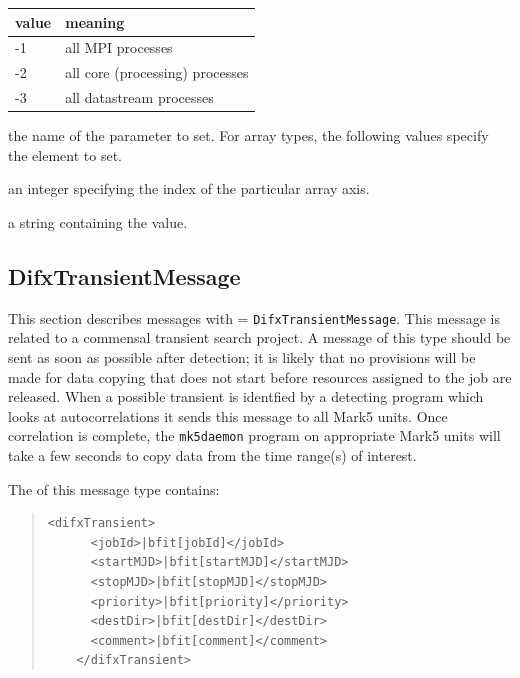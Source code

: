 \begin{description}
\begin{description}
\begin{tabular}{ll}
value & meaning \\
\hline
-1 & all MPI processes \\
-2 & all core (processing) processes \\
-3 & all datastream processes \\
\end{tabular}

\item{} the name of the parameter to set.
For array types, the following  values specify the element to set.
\item{} an integer specifying the index of the particular array axis.
\item{} a string containing the value.

\end{description}
















\subsection{DifxTransientMessage}

This section describes messages with  = {\tt DifxTransientMessage}.
This message is related to a commensal transient search project.
A message of this type should be sent as soon as possible after detection; it is likely that no provisions will be made for data copying that does not start before resources assigned to the job are released.
When a possible transient is identfied by a detecting program which looks at autocorrelations it sends this message to all Mark5 units.  
Once correlation is complete, the {\tt mk5daemon} program on appropriate Mark5 units will take a few seconds to copy data from the time range(s) of interest.

The  of this message type contains:

\begin{quotation}
\begin{Verbatim}[commandchars=\|\[\]]
    <difxTransient>
      <jobId>|bfit[jobId]</jobId>
      <startMJD>|bfit[startMJD]</startMJD>
      <stopMJD>|bfit[stopMJD]</stopMJD>
      <priority>|bfit[priority]</priority>
      <destDir>|bfit[destDir]</destDir>
      <comment>|bfit[comment]</comment>
    </difxTransient>
\end{Verbatim}
\end{quotation}


\end{description}
